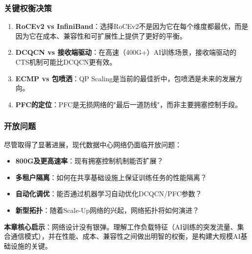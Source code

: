 \subsubsection{关键权衡决策}

\begin{enumerate}
    \item \textbf{RoCEv2 vs InfiniBand}：选择RoCEv2不是因为它在每个维度都最优，而是因为它在成本、兼容性和可扩展性上提供了更好的平衡。
    
    \item \textbf{DCQCN vs 接收端驱动}：在高速（400G+）AI训练场景，接收端驱动的CTS机制可能比DCQCN更有效。
    
    \item \textbf{ECMP vs 包喷洒}：QP Scaling是当前的最佳折中，包喷洒是未来的发展方向。
    
    \item \textbf{PFC的定位}：PFC是无损网络的"最后一道防线"，而非主要拥塞控制手段。
\end{enumerate}

\subsubsection{开放问题}

尽管取得了显著进展，现代数据中心网络仍面临开放问题：

\begin{itemize}
    \item \textbf{800G及更高速率}：现有拥塞控制机制能否扩展？
    \item \textbf{多租户隔离}：如何在共享基础设施上保证训练任务的性能隔离？
    \item \textbf{自动化调优}：能否通过机器学习自动优化DCQCN/PFC参数？
    \item \textbf{新型拓扑}：随着Scale-Up网络的兴起，网络拓扑将如何演进？
\end{itemize}

\textbf{本章核心启示}：网络设计没有银弹。理解工作负载特征（AI训练的突发流量、集合通信模式），并在性能、成本、兼容性之间做出明智的权衡，是构建大规模AI基础设施的关键。
